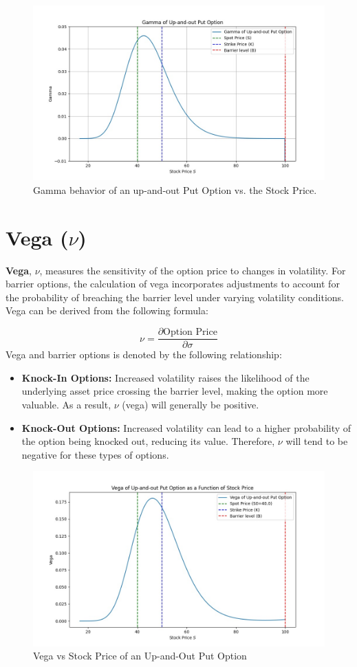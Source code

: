 \begin{figure}[h]
    \centering
    \includegraphics[width=.65\linewidth]{content/images/gamma-upout.png}
    \caption{Gamma behavior of an up-and-out Put Option vs. the Stock Price.}
    \label{fig:gamma_behavior}
\end{figure}

\section{Vega (\(\nu\))}

\textbf{Vega}, $\nu$, measures the sensitivity of the option price to changes in volatility. For barrier options, the calculation of vega incorporates adjustments to account for the probability of breaching the barrier level under varying volatility conditions. Vega can be derived from the following formula:

\begin{equation}
\nu = \frac{\partial \text{Option Price}}{\partial \sigma}
\end{equation}
Vega and barrier options is denoted by the following relationship:
\begin{itemize}
    \item \textbf{Knock-In Options:} Increased volatility raises the likelihood of the underlying asset price crossing the barrier level, making the option more valuable. As a result, \(\nu\) (vega) will generally be positive.
    \item \textbf{Knock-Out Options:} Increased volatility can lead to a higher probability of the option being knocked out, reducing its value. Therefore, \(\nu\) will tend to be negative for these types of options.
\end{itemize}

\begin{figure}[H]
    \centering
    \includegraphics[width=.65\linewidth]{content/images/vega_upout.png}
    \caption{Vega vs Stock Price of an Up-and-Out Put Option}
    \label{fig:vega_behavior}
\end{figure}

